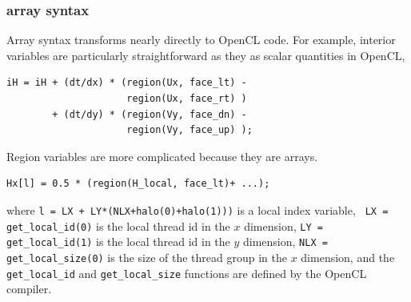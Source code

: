 \subsubsection{array syntax}

Array syntax transforms nearly directly to OpenCL code.  For example, interior
variables are particularly straightforward as they as scalar quantities in
OpenCL,

{\small
\begin{verbatim}
iH = iH + (dt/dx) * (region(Ux, face_lt) - 
                     region(Ux, face_rt) )
        + (dt/dy) * (region(Vy, face_dn) - 
                     region(Vy, face_up) );
\end{verbatim}
}

\noindent
Region variables are more complicated because they are arrays.

{\small
\begin{verbatim}
Hx[l] = 0.5 * (region(H_local, face_lt)+ ...);
\end{verbatim}
}

\noindent
where {\tt l = LX + LY*(NLX+halo(0)+halo(1)))} is a local index variable, {\tt
  LX = get\_local\_id(0)} is the local thread id in the $x$ dimension, {\tt LY =
  get\_local\_id(1)} is the local thread id in the $y$ dimension, {\tt NLX =
  get\_local\_size(0)} is the size of the thread group in the $x$ dimension, and
the {\tt get\_local\_id} and {\tt get\_local\_size} functions are defined by the
OpenCL compiler.
